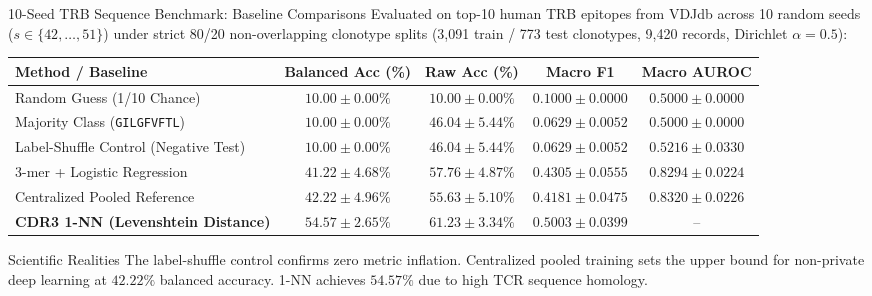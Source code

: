 \documentclass[aspectratio=169,10pt]{beamer}
\begin{document}
\begin{frame}{10-Seed TRB Sequence Benchmark: Baseline Comparisons}
  \scriptsize
  Evaluated on top-10 human TRB epitopes from VDJdb across 10 random seeds ($s \in \{42, \dots, 51\}$) under strict 80/20 non-overlapping clonotype splits (3,091 train / 773 test clonotypes, 9,420 records, Dirichlet $\alpha = 0.5$):
  \vspace{0.1cm}
  \begin{table}[h]
    \centering
    \tiny
    \begin{tabular}{@{}p{4.2cm}cccc@{}}
      \toprule
      \textbf{Method / Baseline} & \textbf{Balanced Acc (\%)} & \textbf{Raw Acc (\%)} & \textbf{Macro F1} & \textbf{Macro AUROC} \\
      \midrule
      Random Guess (1/10 Chance)             & $10.00 \pm 0.00\%$ & $10.00 \pm 0.00\%$ & $0.1000 \pm 0.0000$ & $0.5000 \pm 0.0000$ \\
      Majority Class (\lstinline|GILGFVFTL|) & $10.00 \pm 0.00\%$ & $46.04 \pm 5.44\%$ & $0.0629 \pm 0.0052$ & $0.5000 \pm 0.0000$ \\
      Label-Shuffle Control (Negative Test)  & $10.00 \pm 0.00\%$ & $46.04 \pm 5.44\%$ & $0.0629 \pm 0.0052$ & $0.5216 \pm 0.0330$ \\
      3-mer + Logistic Regression            & $41.22 \pm 4.68\%$ & $57.76 \pm 4.87\%$ & $0.4305 \pm 0.0555$ & $0.8294 \pm 0.0224$ \\
      Centralized Pooled Reference           & $42.22 \pm 4.96\%$ & $55.63 \pm 5.10\%$ & $0.4181 \pm 0.0475$ & $\mathbf{0.8320 \pm 0.0226}$ \\
      \midrule
      \textbf{CDR3 1-NN (Levenshtein Distance)} & $\mathbf{54.57 \pm 2.65\%}$ & $\mathbf{61.23 \pm 3.34\%}$ & $\mathbf{0.5003 \pm 0.0399}$ & -- \\
      \bottomrule
    \end{tabular}
  \end{table}
  \begin{block}{Scientific Realities}
    \scriptsize
    The label-shuffle control confirms zero metric inflation. Centralized pooled training sets the upper bound for non-private deep learning at $42.22\%$ balanced accuracy. 1-NN achieves $54.57\%$ due to high TCR sequence homology.
  \end{block}
\end{frame}
\end{document}
